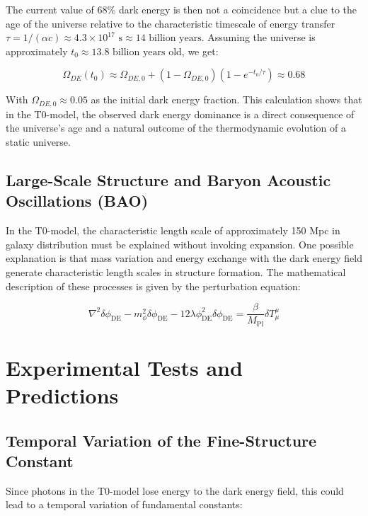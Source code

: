 \documentclass[a4paper,12pt]{article}
\theoremstyle{definition}
\theoremstyle{remark}
\begin{document}
	The current value of 68\% dark energy is then not a coincidence but a clue to the age of the universe relative to the characteristic timescale of energy transfer \(\tau = 1/(\alpha c) \approx 4.3 \times 10^{17} \text{ s} \approx 14 \text{ billion years}\). Assuming the universe is approximately \(t_0 \approx 13.8 \text{ billion years}\) old, we get:
	
	\begin{equation}
		\Omega_{DE}(t_0) \approx \Omega_{DE,0} + (1 - \Omega_{DE,0})(1 - e^{-t_0/\tau}) \approx 0.68
	\end{equation}
	
	With \(\Omega_{DE,0} \approx 0.05\) as the initial dark energy fraction. This calculation shows that in the T0-model, the observed dark energy dominance is a direct consequence of the universe's age and a natural outcome of the thermodynamic evolution of a static universe.
	
	\subsection{Large-Scale Structure and Baryon Acoustic Oscillations (BAO)}
	
	In the T0-model, the characteristic length scale of approximately 150 Mpc in galaxy distribution must be explained without invoking expansion. One possible explanation is that mass variation and energy exchange with the dark energy field generate characteristic length scales in structure formation. The mathematical description of these processes is given by the perturbation equation:
	
	\begin{equation}
		\nabla^2 \delta\phi_{\text{DE}} - m_{\phi}^2 \delta\phi_{\text{DE}} - 12\lambda\phi_{\text{DE}}^2 \delta\phi_{\text{DE}} = \frac{\beta}{M_{\text{Pl}}}\delta T^{\mu}_{\mu}
	\end{equation}
	
	\section{Experimental Tests and Predictions}
	
	\subsection{Temporal Variation of the Fine-Structure Constant}
	
	Since photons in the T0-model lose energy to the dark energy field, this could lead to a temporal variation of fundamental constants:
	
\end{document}
